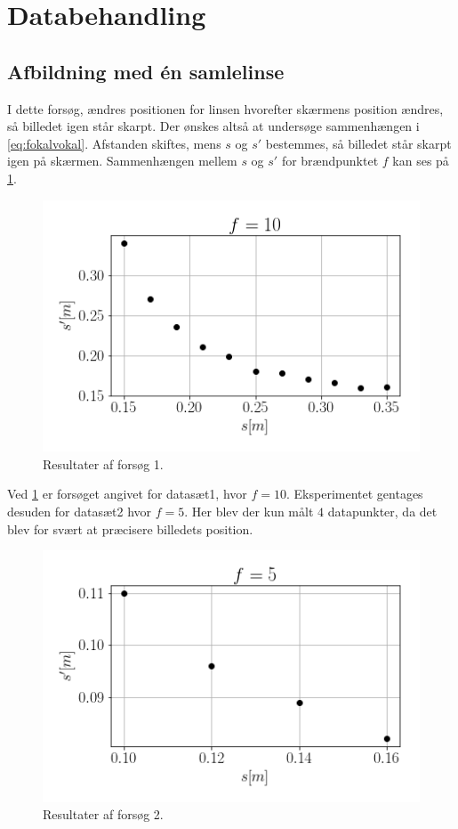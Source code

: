 \section{Databehandling}
\subsection{Afbildning med én samlelinse}
I dette forsøg, ændres positionen for linsen hvorefter skærmens position ændres, så billedet igen står skarpt. Der ønskes altså at undersøge sammenhængen i \cref{eq:fokalvokal}. Afstanden skiftes, mens $s$ og $s'$ bestemmes, så billedet står skarpt igen på skærmen.
Sammenhængen mellem $s$ og $s'$ for brændpunktet $f$ kan ses på \cref{fig:res1}.
\begin{figure}[H]
    \includegraphics[width=\linewidth]{res1.png}
    \caption{Resultater af forsøg 1.}
    \label{fig:res1}
\end{figure}
Ved \cref{fig:res1} er forsøget angivet for datasæt1, hvor $f = 10$. Eksperimentet gentages desuden for datasæt2 hvor $f = 5$. Her blev der kun målt $4$ datapunkter, da det blev for svært at præcisere billedets position.
\begin{figure}[H]
    \includegraphics[width=\linewidth]{res2.png}
    \caption{Resultater af forsøg 2.}
    \label{fig:res2}
\end{figure}
